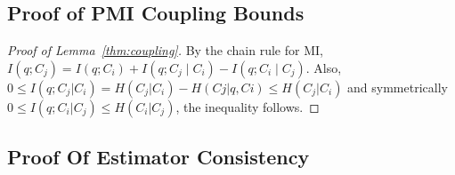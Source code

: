 \documentclass{article} %
\theoremstyle{definition}
\begin{document}
\subsection{Proof of PMI Coupling Bounds}\label{sec:proof-pmi-bounds}

\begin{proof}[Proof of Lemma~\ref{thm:coupling}]
By the chain rule for MI,
$I(q;C_j) = I(q;C_i) + I(q;C_j\mid C_i) - I(q;C_i\mid C_j)$. Also, $0 \le I(q;C_j|C_i) = H(C_j|C_i) - H(Cj|q,Ci) \le H(C_j|C_i)$ and symmetrically $0 \le I(q;C_i|C_j) \le H(C_i|C_j)$, the inequality follows.
\end{proof}

\subsection{Proof Of Estimator Consistency}\label{proof-estimator-consistency}
\end{document}
